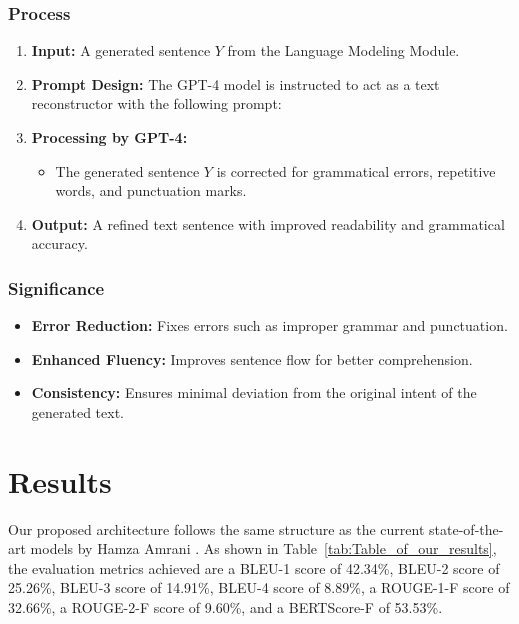 \documentclass[journal]{IEEEtran}
\begin{document}
\subsubsection{Process}
\begin{enumerate}
	\item \textbf{Input:} A generated sentence \( Y \) from the Language Modeling Module.
	\item \textbf{Prompt Design:} The GPT-4 model is instructed to act as a text reconstructor with the following prompt:
	\item \textbf{Processing by GPT-4:}
	      \begin{itemize}
	      	\item The generated sentence \( Y \) is corrected for grammatical errors, repetitive words, and punctuation marks.
	      \end{itemize}
	\item \textbf{Output:} A refined text sentence with improved readability and grammatical accuracy.
\end{enumerate}

\subsubsection{Significance}
\begin{itemize}
	\item \textbf{Error Reduction:} Fixes errors such as improper grammar and punctuation.
	\item \textbf{Enhanced Fluency:} Improves sentence flow for better comprehension.
	\item \textbf{Consistency:} Ensures minimal deviation from the original intent of the generated text.
\end{itemize}

\section{Results}

Our proposed architecture follows the same structure as the current state-of-the-art models by Hamza Amrani \cite{Amrani}. As shown in Table~\ref{tab:Table_of_our_results}, the evaluation metrics achieved are a BLEU-1 score of 42.34\%, BLEU-2 score of 25.26\%, BLEU-3 score of 14.91\%, BLEU-4 score of 8.89\%, a ROUGE-1-F score of 32.66\%, a ROUGE-2-F score of 9.60\%, and a BERTScore-F of 53.53\%.
\end{document}
